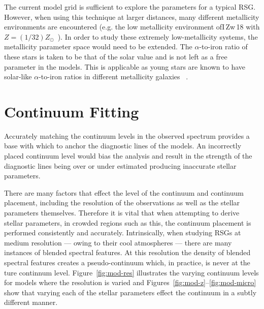 The current model grid is sufficient to explore the parameters for a typical RSG.
However, when using this technique at larger distances,
many different metallicity environments are encountered (e.g. the low metallicity environment ofI\,Zw\,18 with $Z=(1/32)Z_{\odot}$~\citep{1998ApJ...508..248V}).
In order to study these extremely low-metallicity systems,
the metallicity parameter space would need to be extended.
The $\alpha$-to-iron ratio of these stars is taken to be that of the solar value and is not left as a free parameter in the models.
This is applicable as young stars are known to have solar-like $\alpha$-to-iron ratios in different metallicity galaxies
~\citep[see tables 3 and 4 in][and references therein]{2015ApJ...806...21D}.

\section{Continuum Fitting} %
\label{sub:continuum_fitting}

Accurately matching the continuum levels in the observed
spectrum provides a base with which to anchor the diagnostic lines of the models.
An incorrectly placed continuum level would bias the analysis and result in the
strength of the diagnostic lines being over or under estimated producing inaccurate stellar parameters.

There are many factors that effect the level of the continuum and continuum placement,
including the resolution of the observations as well as the stellar parameters themselves.
Therefore it is vital that when attempting to derive stellar parameters,
in crowded regions such as this, the continuum placement is performed
consistently and accurately.
Intrinsically, when studying RSGs at medium resolution --- owing  to their cool atmospheres ---
there are many instances of blended spectral features.
At this resolution the density of blended spectral features creates a pseudo-continuum which, in practice,
is never at the ture continnum level.
Figure~\ref{fig:mod-res} illustrates the varying continuum levels for models where the resolution is varied and
Figures~\ref{fig:mod-z}--\ref{fig:mod-micro} show that varying each of the stellar parameters effect the continuum in a subtly different manner.


